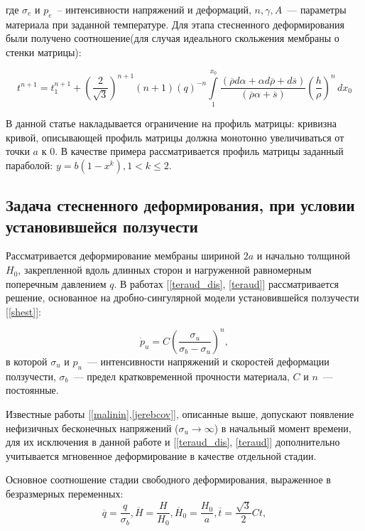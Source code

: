 где $\sigma_e$ и $p_e$~-- интенсивности напряжений и деформаций, $n, \gamma, A$~--- параметры материала при заданной температуре.
Для этапа стесненного деформирования были получено соотношение(для случая идеального скольжения мембраны о стенки матрицы): 

\begin{equation}
t^{n+1} = t_1^{n+1}+\left(\dfrac{2}{\sqrt 3}\right)^{n+1}(n+1)(q)^{-n}\int\limits_1^{x_0}\dfrac{(\overline{\rho} d\alpha + \alpha 
   d\overline{\rho}+d\overline{s})}{(\overline{\rho} \alpha + \overline{s})}\left(\dfrac{h}{\rho}\right)^n\, dx_0
\end{equation}

В данной статье накладывается ограничение на профиль матрицы: кривизна кривой, описывающей профиль
матрицы должна монотонно увеличиваться от точки $a$ к $0$.
 В качестве примера рассматривается профиль матрицы заданный параболой: $y= b(1-x^k), 1<k\leqslant 2$. 

\subsection{Задача стесненного деформирования, при условии установившейся ползучести}
Рассматривается деформирование мембраны шириной $2a$ и начально толщиной $H_0$, закрепленной вдоль длинных сторон и нагруженной равномерным поперечным давлением $q$.
В работах [\ref{teraud_dis}, \ref{teraud}] рассматривается решение, основанное на дробно-сингулярной модели установившейся ползучести [\ref{shest}]:

 \begin{equation}
  \dot{p}_u = C \left( \frac{\sigma_u}{\sigma_b - \sigma_u} \right)^n, 
  \label{main_equation}
 \end{equation}
в которой $\sigma_u$ и $\textit{\.{p}}_u$~--- интенсивности напряжений и скоростей деформации ползучести, $\sigma_b$~--- предел кратковременной прочности материала, $C$ и $n$~--- постоянные.


 Известные работы [\ref{malinin},\ref{jerebcov}], описанные выше, допускают появление нефизичных бесконечных напряжений ($\sigma_u \to \infty$) в начальный момент времени, для их исключения в данной работе и [\ref{teraud_dis}, \ref{teraud}] дополнительно учитывается мгновенное деформирование в качестве отдельной стадии.
 
 Основное соотношение стадии свободного деформирования, выраженное в безразмерных переменных:
 \begin{equation}
	\overline{q} = \dfrac{q}{\sigma_b}, \overline{H} = \dfrac{H}{H_0}, \overline{H}_0 = \dfrac{H_0}{a}, \overline{t} = \dfrac{\sqrt 3}{2}Ct, 
 \end{equation}   

